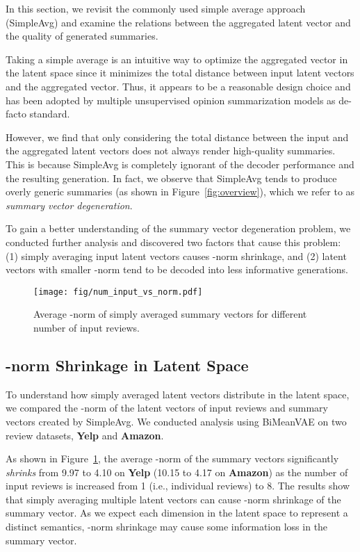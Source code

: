 \documentclass[11pt]{article}
\newcommand{\name}{\mbox{\sc BiMeanVAE}}
\newcommand{\simpleavg}{\mbox{SimpleAvg}}
\newcommand{\yelp}{\mbox{\bf Yelp}}
\newcommand{\amazon}{\mbox{\bf Amazon}}
\begin{document}
In this section, we revisit the commonly used simple average approach (\simpleavg) and examine the relations between the aggregated latent vector and the quality of generated summaries.

Taking a simple average is an intuitive way to optimize the aggregated vector in the latent space since it minimizes the total distance between input latent vectors and the aggregated vector. Thus, it appears to be a reasonable design choice and has been adopted by multiple unsupervised opinion summarization models as de-facto standard. 

However, we find that only considering the total distance between the input and the aggregated latent vectors does not always render high-quality summaries. This is because \simpleavg{} is completely ignorant of the decoder performance and the resulting generation. In fact, we observe that \simpleavg{} tends to produce overly generic summaries (as shown in Figure~\ref{fig:overview}), which we refer to as {\em summary vector degeneration}.

To gain a better understanding of the summary vector degeneration problem, we conducted further analysis and discovered two factors that cause this problem: 
(1) simply averaging input latent vectors causes -norm shrinkage, and (2) latent vectors with smaller -norm tend to be decoded into less informative generations.

\begin{figure}[t]
    \centering
    \texttt{[image: fig/num\_input\_vs\_norm.pdf]}
    \caption{Average -norm of simply averaged summary vectors for different number of input reviews.}\label{fig:num_input_vs_norm}
\end{figure}

\subsection{-norm Shrinkage in Latent Space}
\label{sub:avg_degenerate}

To understand how simply averaged latent vectors distribute in the latent space, we compared the -norm of the latent vectors of input reviews and summary vectors created by \simpleavg.
We conducted analysis using \name{} on two review datasets, \yelp{} and \amazon. 

As shown in Figure~\ref{fig:num_input_vs_norm}, the average -norm of the summary vectors significantly {\em shrinks} from 9.97 to 4.10 on \yelp{} (10.15 to 4.17 on \amazon) as the number of input reviews is increased from 1 (i.e., individual reviews) to 8.
The results show that simply averaging multiple latent vectors can cause -norm shrinkage of the summary vector.
As we expect each dimension in the latent space to represent a distinct semantics, 
-norm shrinkage may cause some information loss in the summary vector.
\end{document}
